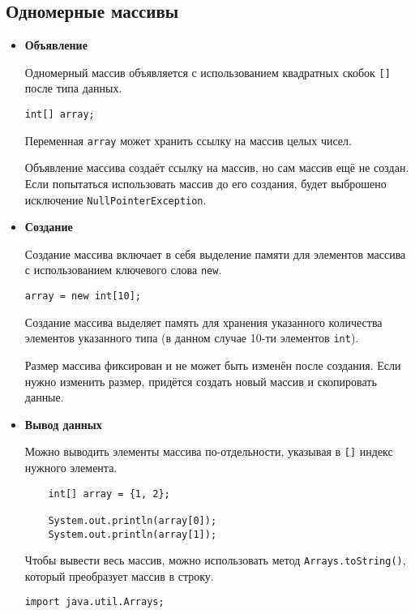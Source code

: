 \subsection{Одномерные массивы}
\begin{itemize}
    \item \textbf{Объявление}\par
    Одномерный массив объявляется с использованием квадратных скобок \texttt{[]} после типа данных.
    \begin{verbatim}
int[] array;
    \end{verbatim}
    Переменная \texttt{array} может хранить ссылку на массив целых чисел.\par
    Объявление массива создаёт ссылку на массив, но сам массив ещё не создан.\newline
    Если попытаться использовать массив до его создания, будет выброшено исключение \texttt{NullPointerException}.
    
    \item \textbf{Создание}\par
    Создание массива включает в себя выделение памяти для элементов массива с использованием ключевого слова \texttt{new}.
    \begin{verbatim}
array = new int[10];
    \end{verbatim}
    Создание массива выделяет память для хранения указанного количества элементов указанного типа (в данном случае 10-ти элементов \texttt{int}).\par
    Размер массива фиксирован и не может быть изменён после создания. Если нужно изменить размер, придётся создать новый массив и скопировать данные.

    \item \textbf{Вывод данных}\par
    Можно выводить элементы массива по-отдельности, указывая в \texttt{[]} индекс нужного элемента.
    \begin{verbatim}
    int[] array = {1, 2};

    System.out.println(array[0]);
    System.out.println(array[1]);
    \end{verbatim}
    Чтобы вывести весь массив, можно использовать метод \texttt{Arrays.toString()}, который преобразует массив в строку.
    \begin{verbatim}
import java.util.Arrays;


\end{verbatim}
\end{itemize}

